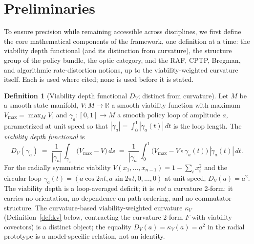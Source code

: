 \documentclass[11pt,a4paper]{article}
\theoremstyle{plain}
\theoremstyle{definition}
\newtheorem{definition}[theorem]{Definition}
\theoremstyle{remark}
\newcommand{\kk}{\kappa_{\!V}}
\newcommand{\RR}{\mathbb{R}}
\begin{document}
\section{Preliminaries}\label{sec:prelim}

To ensure precision while remaining accessible across disciplines,
we first define the core mathematical components of the framework,
one definition at a time: the viability depth functional (and its
distinction from curvature), the structure group of the policy bundle,
the optic category, and the RAF, CPTP, Bregman, and algorithmic
rate-distortion notions, up to the viability-weighted curvature
itself. Each is used where cited; none is used before it is stated.

\begin{definition}[Viability depth functional $D_V$; distinct from curvature]
\label{def:kappa-depth}
Let $M$ be a smooth state manifold, $V:M\to\RR$ a smooth viability
function with maximum $V_{\max}=\max_M V$, and $\gamma_a:[0,1]\to M$ a
smooth policy loop of amplitude $a$, parametrized at unit speed so that
$|\gamma_a| = \int_0^1|\dot\gamma_a(t)|\,dt$ is the loop length. The
\emph{viability depth functional} is
\begin{equation}\label{eq:DV}
  D_V(\gamma_a) \;=\; \frac{1}{|\gamma_a|}\int_{\gamma_a}\!\bigl(V_{\max}-V\bigr)\,ds
  \;=\; \frac{1}{|\gamma_a|}\int_0^1\!\bigl(V_{\max}-V\circ\gamma_a(t)\bigr)\,|\dot\gamma_a(t)|\,dt.
\end{equation}
For the radially symmetric viability $V(x_1,\ldots,x_{n-1}) = 1 - \sum_i
x_i^2$ and the circular loop $\gamma_a(t) = (a\cos 2\pi t, a\sin 2\pi t,
0,\ldots,0)$ at unit speed, $D_V(a) = a^2$. The viability depth is a
loop-averaged deficit; it is \emph{not} a curvature 2-form: it carries
no orientation, no dependence on path ordering, and no commutator
structure. The curvature-based viability-weighted curvature $\kk$
(Definition~\ref{def:kv} below, contracting the curvature
$2$-form $F$ with viability covectors) is a distinct object; the
equality $D_V(a) = \kk(a) = a^2$ in the radial prototype is a
model-specific relation, not an identity.
\end{definition}
\end{document}

